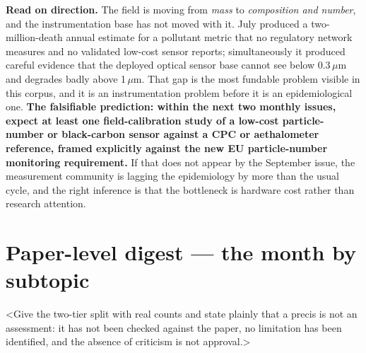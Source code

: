 \documentclass[10pt]{article}
\begin{document}
\vspace{3mm}

\footnotesize
\textbf{Read on direction.} The field is moving from \emph{mass} to \emph{composition and
number}, and the instrumentation base has not moved with it. July produced a
two-million-death annual estimate for a pollutant metric that no regulatory network
measures and no validated low-cost sensor reports; simultaneously it produced careful
evidence that the deployed optical sensor base cannot see below 0.3\,$\mu$m and degrades
badly above 1\,$\mu$m. That gap is the most fundable problem visible in this corpus, and
it is an instrumentation problem before it is an epidemiological one. \textbf{The
falsifiable prediction: within the next two monthly issues, expect at least one
field-calibration study of a low-cost particle-number or black-carbon sensor against a
CPC or aethalometer reference, framed explicitly against the new EU particle-number
monitoring requirement.} If that does not appear by the September issue, the
measurement community is lagging the epidemiology by more than the usual cycle, and the
right inference is that the bottleneck is hardware cost rather than research attention.

\clearpage

\section*{\sffamily\bfseries\color{Deep}Paper-level digest --- the month by subtopic}
\vspace{-1.5mm}{\color{Coral}\rule{\linewidth}{1.1pt}}\vspace{2mm}

\footnotesize
<Give the two-tier split with real counts and state plainly that a precis is not an
assessment: it has not been checked against the paper, no limitation has been identified,
and the absence of criticism is not approval.>
\end{document}
